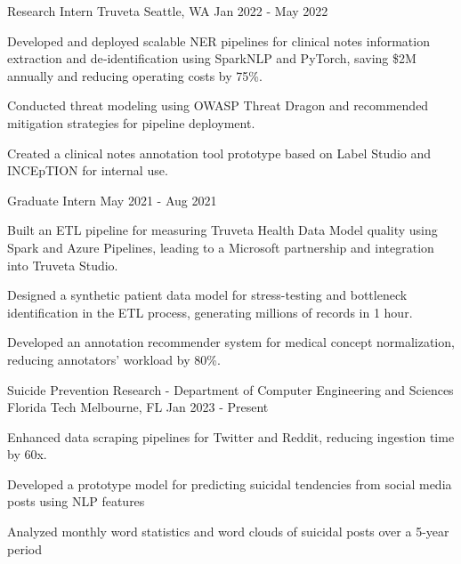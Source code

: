 \vspace{-4mm}
\vspace{-2mm}

\begin{cventries}

	\cventry
	{Research Intern}
	{Truveta}
	{Seattle, WA}
	{Jan 2022 - May 2022}
	{\begin{cvitems}
			\item {Developed and deployed scalable NER pipelines for clinical notes information extraction and de‑identification using SparkNLP and PyTorch, saving \$2M annually and reducing operating costs by 75\%.}
			\item {Conducted threat modeling using OWASP Threat Dragon and recommended mitigation strategies for pipeline deployment.}
			\item {Created a clinical notes annotation tool prototype based on Label Studio and INCEpTION for internal use.}
		\end{cvitems}}

	\vspace{-2mm}

	\cventry
	{Graduate Intern}
	{}
	{}
	{May 2021 - Aug 2021}
	{\begin{cvitems}
			\item {Built an ETL pipeline for measuring Truveta Health Data Model quality using Spark and Azure Pipelines, leading to a Microsoft partnership and integration into Truveta Studio.}
			\item {Designed a synthetic patient data model for stress-testing and bottleneck identification in the ETL process, generating millions of records in 1 hour.}
			\item {Developed an annotation recommender system for medical concept normalization, reducing annotators' workload by 80\%.}
		\end{cvitems}}

	\cventry
	{Suicide Prevention Research - Department of Computer Engineering and Sciences}
	{Florida Tech}
	{Melbourne, FL}
	{Jan 2023 - Present}
	{\begin{cvitems}
			\item {Enhanced data scraping pipelines for Twitter and Reddit, reducing ingestion time by 60x.}
			\item {Developed a prototype model for predicting suicidal tendencies from social media posts using NLP features}
			\item {Analyzed monthly word statistics and word clouds of suicidal posts over a 5-year period}
		\end{cvitems}}


\end{cventries}
